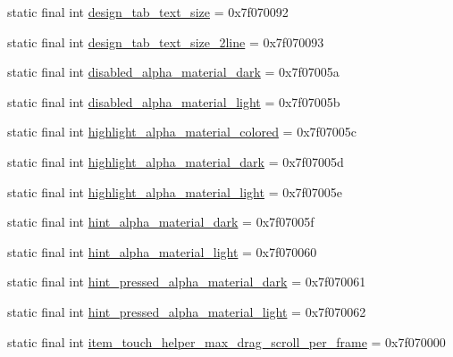 \begin{CompactItemize}
\item 
static final int \hyperlink{classandroid_1_1support_1_1graphics_1_1drawable_1_1_r_1_1dimen_a8193249dce778abd8de9d3fdd46f9a6}{design\_\-tab\_\-text\_\-size} = 0x7f070092
\item 
static final int \hyperlink{classandroid_1_1support_1_1graphics_1_1drawable_1_1_r_1_1dimen_b6786749cb45c1a3dddae90a98537a84}{design\_\-tab\_\-text\_\-size\_\-2line} = 0x7f070093
\item 
static final int \hyperlink{classandroid_1_1support_1_1graphics_1_1drawable_1_1_r_1_1dimen_860f2b273143f0f40769ec5327f0f1ce}{disabled\_\-alpha\_\-material\_\-dark} = 0x7f07005a
\item 
static final int \hyperlink{classandroid_1_1support_1_1graphics_1_1drawable_1_1_r_1_1dimen_929520c7bf102ee29cb8ced302b56aaa}{disabled\_\-alpha\_\-material\_\-light} = 0x7f07005b
\item 
static final int \hyperlink{classandroid_1_1support_1_1graphics_1_1drawable_1_1_r_1_1dimen_9e2035be2bd24b3cdeecf31fe1bedb87}{highlight\_\-alpha\_\-material\_\-colored} = 0x7f07005c
\item 
static final int \hyperlink{classandroid_1_1support_1_1graphics_1_1drawable_1_1_r_1_1dimen_e100f1c7182a913f90d4d2160277ecec}{highlight\_\-alpha\_\-material\_\-dark} = 0x7f07005d
\item 
static final int \hyperlink{classandroid_1_1support_1_1graphics_1_1drawable_1_1_r_1_1dimen_d6267070e9011c7d71265fb25fb27e81}{highlight\_\-alpha\_\-material\_\-light} = 0x7f07005e
\item 
static final int \hyperlink{classandroid_1_1support_1_1graphics_1_1drawable_1_1_r_1_1dimen_5eab4259b229ff9f220a08fe8fef31bd}{hint\_\-alpha\_\-material\_\-dark} = 0x7f07005f
\item 
static final int \hyperlink{classandroid_1_1support_1_1graphics_1_1drawable_1_1_r_1_1dimen_2820fd9db71ca42fea6b26bef5c55af1}{hint\_\-alpha\_\-material\_\-light} = 0x7f070060
\item 
static final int \hyperlink{classandroid_1_1support_1_1graphics_1_1drawable_1_1_r_1_1dimen_6b5e660d937eb263bc8c06050bb411ca}{hint\_\-pressed\_\-alpha\_\-material\_\-dark} = 0x7f070061
\item 
static final int \hyperlink{classandroid_1_1support_1_1graphics_1_1drawable_1_1_r_1_1dimen_a88c427d4f0af29113c3ada22f67e2be}{hint\_\-pressed\_\-alpha\_\-material\_\-light} = 0x7f070062
\item 
static final int \hyperlink{classandroid_1_1support_1_1graphics_1_1drawable_1_1_r_1_1dimen_3a56253e002a62dc409675117044b156}{item\_\-touch\_\-helper\_\-max\_\-drag\_\-scroll\_\-per\_\-frame} = 0x7f070000

\end{CompactItemize}
